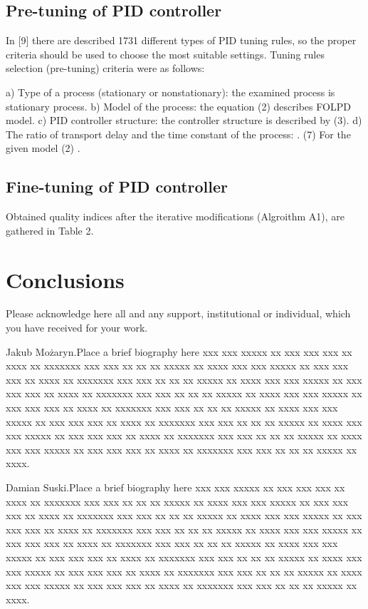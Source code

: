 \documentclass{amcs}
\begin{document}
\subsection{Pre-tuning of PID controller}
In [9] there are described 1731 different types of PID tuning rules, so the proper criteria should be used to choose the most suitable settings. Tuning rules selection (pre-tuning) criteria were as follows:

a) Type of a process (stationary or nonstationary): the examined process is stationary process.
b) Model of the process: the equation (2) describes FOLPD model.
c) PID controller structure: the controller structure is described by (3).
d) The ratio of transport delay and the time constant of the process:
.	(7)
For the given model (2)  .

\subsection{Fine-tuning of PID controller}

Obtained quality indices after the iterative modifications (Algroithm A1), are gathered in Table 2.

\section{Conclusions}

\begin{acknowledgment}
Please acknowledge here all and any support, institutional or individual, which you have received for your work.
\end{acknowledgment}



\begin{biography}[photo]{Jakub Mo\.{z}aryn.}Place a brief biography here xxx xxx xxxxx xx xxx xxx xxx xx xxxx xx xxxxxxx xxx xxx xx xx xx xxxxx xx xxxx xxx xxx xxxxx xx xxx xxx xxx xx xxxx xx xxxxxxx xxx xxx xx xx xx xxxxx xx xxxx xxx xxx xxxxx xx xxx xxx xxx xx xxxx xx xxxxxxx xxx xxx xx xx xx xxxxx xx xxxx xxx xxx xxxxx xx xxx xxx xxx xx xxxx xx xxxxxxx xxx xxx xx xx xx xxxxx xx xxxx xxx xxx xxxxx xx xxx xxx xxx xx xxxx xx xxxxxxx xxx xxx xx xx xx xxxxx xx xxxx xxx xxx xxxxx xx xxx xxx xxx xx xxxx xx xxxxxxx xxx xxx xx xx xx xxxxx xx xxxx xxx xxx xxxxx xx xxx xxx xxx xx xxxx xx xxxxxxx xxx xxx xx xx xx xxxxx xx xxxx.
\end{biography}

\begin{biography}[]{Damian Suski.}Place a brief biography here xxx xxx xxxxx xx xxx xxx xxx xx xxxx xx xxxxxxx xxx xxx xx xx xx xxxxx xx xxxx xxx xxx xxxxx xx xxx xxx xxx xx xxxx xx xxxxxxx xxx xxx xx xx xx xxxxx xx xxxx xxx xxx xxxxx xx xxx xxx xxx xx xxxx xx xxxxxxx xxx xxx xx xx xx xxxxx xx xxxx xxx xxx xxxxx xx xxx xxx xxx xx xxxx xx xxxxxxx xxx xxx xx xx xx xxxxx xx xxxx xxx xxx xxxxx xx xxx xxx xxx xx xxxx xx xxxxxxx xxx xxx xx xx xx xxxxx xx xxxx xxx xxx xxxxx xx xxx xxx xxx xx xxxx xx xxxxxxx xxx xxx xx xx xx xxxxx xx xxxx xxx xxx xxxxx xx xxx xxx xxx xx xxxx xx xxxxxxx xxx xxx xx xx xx xxxxx xx xxxx.
\end{biography}
\end{document}
